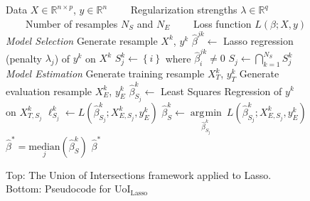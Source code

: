 \documentclass[letterpaper, 10 pt, conference]{ieeeconf}  %
\DeclareMathOperator*{\argmin}{\arg\!\min}
\begin{document}
\begin{figure}[t]
    \centering
    \vspace{-10pt}
    \begin{algorithmic}[1]
        \renewcommand{\algorithmicrequire}{\textbf{Input:}}
        \renewcommand{\algorithmicensure}{\textbf{Output:}}
        \REQUIRE Data $X \in \mathbb{R}^{n\times p}$, $y \in \mathbb{R}^{n}$
        \STATE \ \ \ \  Regularization strengths $\lambda \in \mathbb{R}^q$
        \STATE \ \ \ \  Number of resamples $N_S$ and $N_E$
        \STATE \ \ \ \  Loss function $L(\beta; X, y)$
        \STATE \textit{Model Selection}
            \STATE Generate resample $X^k$, $y^k$
                \STATE $\hat{\beta}^{jk}\leftarrow$ Lasso regression (penalty $\lambda_j$) of $y^k$ on $X^k$
                \STATE $S_j^k \leftarrow \left\{i\right\}$ where $\hat{\beta}^{jk}_i \neq 0$
            \ENDFOR
        \ENDFOR
            \STATE $\displaystyle S_j \leftarrow \bigcap_{k=1}^{N_S}S_j^k$
        \ENDFOR
        \STATE \textit{Model Estimation}
            \STATE Generate training resample $X_T^k$, $y_T^k$
            \STATE Generate evaluation resample $X_E^k$, $y_E^k$
                \STATE $\hat{\beta}^k_{S_j} \leftarrow$ Least Squares Regression of $y^k$ on $X_{T, S_j}^k$
                \STATE $\ell^k_{S_j} \leftarrow L(\hat{\beta}^k_{S_j}; X^k_{E, S_j}, y_E^k)$
            \ENDFOR
            \STATE $\hat{\beta}^k_S \leftarrow \underset{\hat{\beta}^k_{S_j}}{\argmin} \ L(\hat{\beta}^k_{S_j} ; X^k_{E, S_j}, y^k_E)$
        \ENDFOR
        \STATE $\hat{\beta}^* = \underset{j}{\text{median}}\left(\hat{\beta}_S^k\right)$
        \RETURN $\hat{\beta}^*$ 
    \end{algorithmic} 
    \vspace{-8pt}
    \caption{Top: The Union of Intersections framework applied to Lasso. Bottom: Pseudocode for UoI$_{\text{Lasso}}$}
    \label{fig:uoi}
\end{figure}
\end{document}
